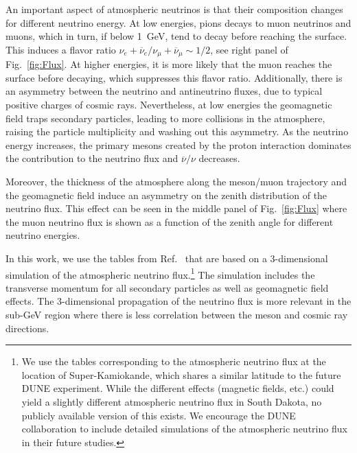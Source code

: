 An important aspect of atmospheric neutrinos is that their composition changes for different neutrino energy.
At low energies, pions decays to muon neutrinos and muons, which in turn, if below 1~GeV, tend to decay before reaching the surface.
This induces a flavor ratio $\nu_{e} +
\overline{\nu}_{e}/\nu_{\mu} + \overline{\nu}_{\mu} \sim 1/2$, see right panel of Fig.~\ref{fig:Flux}. 
At higher energies, it is more likely that the muon reaches the surface before decaying, which suppresses this flavor ratio.
Additionally, there is an asymmetry between the neutrino and antineutrino fluxes, due to typical positive charges of cosmic rays.
Nevertheless, at low energies the geomagnetic field traps secondary particles, leading to more collisions in the atmosphere, raising the particle multiplicity and washing out this asymmetry.
As the neutrino
energy increases, the primary mesons created by the proton interaction
dominates the contribution to the neutrino flux and
$\overline{\nu}/\nu$ decreases. 
%


Moreover, the thickness of the atmosphere along the meson/muon trajectory and the geomagnetic field induce an asymmetry on the zenith distribution of the neutrino flux. 
This effect can be seen in the middle panel of Fig.~\ref{fig:Flux} where the muon neutrino flux is shown as a function of the zenith angle for different neutrino energies.


In this work, we use the tables from Ref.~\cite{Honda:2015fha} that are
based on a 3-dimensional simulation of the atmospheric neutrino flux.\footnote{We use the tables corresponding to the atmospheric neutrino flux at the location of Super-Kamiokande, which shares a similar latitude to the future DUNE experiment. While the different effects (magnetic fields, etc.) could yield a slightly different atmospheric neutrino flux in South Dakota, no publicly available version of this exists. We encourage the DUNE collaboration to include detailed simulations of the atmospheric neutrino flux in their future studies.}
The simulation includes the transverse momentum for
all secondary particles as well as geomagnetic field effects. 
The 3-dimensional
propagation of the neutrino flux is more relevant in the sub-GeV
region where there is less correlation between the meson and cosmic ray directions. 

